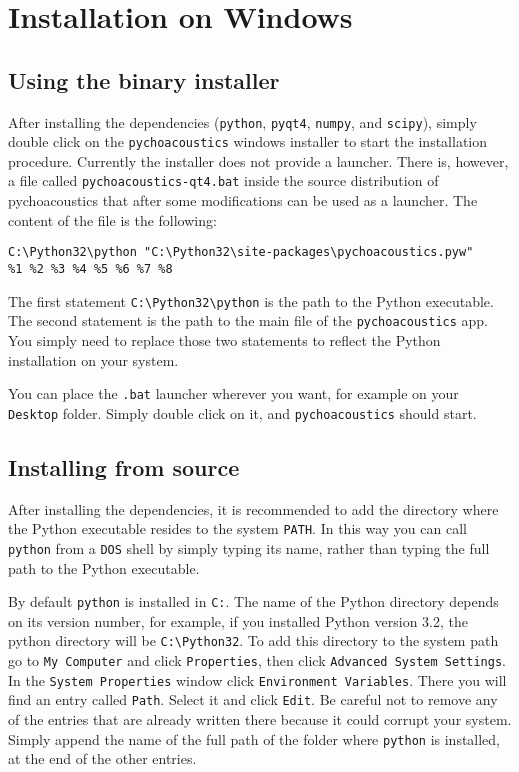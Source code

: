 \section{Installation on Windows}

\subsection{Using the binary installer}
After installing the dependencies (\texttt{python}, \texttt{pyqt4}, \texttt{numpy}, and \texttt{scipy}), simply double click on the \texttt{pychoacoustics}
windows installer to start the installation procedure. Currently the installer does not provide a launcher.
There is, however, a file called \texttt{pychoacoustics-qt4.bat} inside the source distribution of pychoacoustics that
after some modifications can be used as a launcher. The content of the file is the following:
\begin{verbatim}
C:\Python32\python "C:\Python32\site-packages\pychoacoustics.pyw" 
%1 %2 %3 %4 %5 %6 %7 %8
\end{verbatim}
The first statement \verb+C:\Python32\python+ is the path to the Python executable.
The second statement is the path to the main file of the \texttt{pychoacoustics} app.
You simply need to replace those two statements to reflect the Python installation on your system.

You can place the \texttt{.bat} launcher wherever you want, for example on your \texttt{Desktop}
folder. Simply double click on it, and \texttt{pychoacoustics} should start.

\subsection{Installing from source}
After installing the dependencies, it is recommended to add the directory 
where the Python executable resides to the system \verb+PATH+. In this way 
you can call \texttt{python} from a \texttt{DOS} shell by simply typing its 
name, rather than typing the full path to the Python executable.

By default \texttt{python} is installed in \verb+C:+. The name of the Python
directory depends on its version number, for example, if you installed Python 
version 3.2, the python directory will be \verb+C:\Python32+. To add this 
directory to the system path go to \texttt{My Computer} and click \texttt{Properties}, 
then click \texttt{Advanced System Settings}. In the \texttt{System Properties} window 
click \texttt{Environment Variables}. There you will find an entry called \texttt{Path}. 
Select it and click \texttt{Edit}. Be careful not to remove any of the entries that are 
already written there because it could corrupt your system. Simply append the name of 
the full path of the folder where \texttt{python} is installed, at the end of the other entries.

